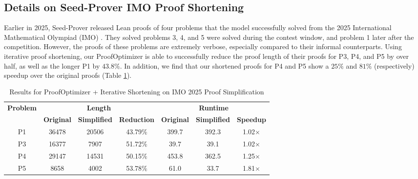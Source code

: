 \subsection{Details on Seed-Prover IMO Proof Shortening} \label{subsec-imo-proof-shortening}

Earlier in 2025, Seed-Prover released Lean proofs of four problems that the model successfully solved from the 2025 International Mathematical Olympiad (IMO) \citep{chen2507seed}. They solved problems 3, 4, and 5 were solved during the contest window, and problem 1 later after the competition. However, the proofs of these problems are extremely verbose, especially compared to their informal counterparts. Using iterative proof shortening, our ProofOptimizer is able to successfully reduce the proof length of their proofs for P3, P4, and P5 by over half, as well as the longer P1 by $43.8\%$. In addition, we find that our shortened proofs for P4 and P5 show a $25\%$ and $81\%$ (respectively) speedup over the original proofs (Table \ref{tab:seed-imo-results-all}).

\begin{table}[H]
\caption{Results for ProofOptimizer + Iterative Shortening on IMO 2025 Proof Simplification}
\label{tab:seed-imo-results-all}
\centering
\begin{tabular}{c ccc ccc}
\toprule
\multirow{2}{*}{\textbf{Problem}} 
 & \multicolumn{3}{c}{\textbf{Length}} 
 & \multicolumn{3}{c}{\textbf{Runtime}} \\
\cmidrule(lr){2-4} \cmidrule(lr){5-7}
 & \textbf{Original} & \textbf{Simplified} & \textbf{Reduction} 
 & \textbf{Original} & \textbf{Simplified} & \textbf{Speedup} \\
\midrule
P1 & 36478 & 20506 & 43.79\% & 399.7 & 392.3 & 1.02$\times$ \\
P3 & 16377 & 7907  & 51.72\% & 39.7  & 39.1  & 1.02$\times$ \\
P4 & 29147 & 14531 & 50.15\% & 453.8 & 362.5 & 1.25$\times$ \\
P5 & 8658  & 4002  & 53.78\% & 61.0  & 33.7  & 1.81$\times$ \\
\bottomrule
\end{tabular}
\end{table}

